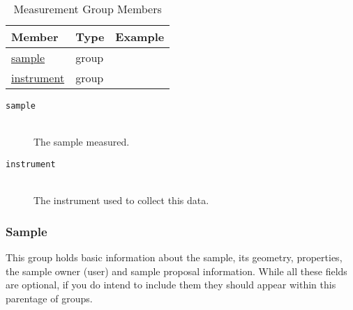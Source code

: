 \begin{table}[h!]\sffamily
\centering
\footnotesize
\caption{Measurement Group Members}
\begin{tabular}{l l l}
\toprule
\bfseries Member     & \bfseries Type & \bfseries Example \\
\midrule
\hyperref[table:sample]{sample} & group &  \\
\hyperref[table:instrument]{instrument} & group & \\
\bottomrule
\end{tabular}
\end{table}

\begin{description}
\item[\tt{sample}] \hfill \\
{The sample measured.}

\item[\tt {instrument}] \hfill \\
{The instrument used to collect this data.}
\end{description}

\subsubsection{Sample}
\label{table:sample}

This group holds basic information about the sample, its geometry, properties,
the sample owner (user) and sample proposal information. While all these fields
are optional, if you do intend to include them they should appear within this parentage of
groups.

